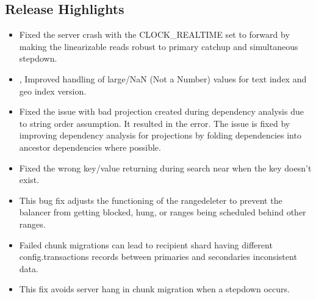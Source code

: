 \documentclass[letterpaper,10pt,english]{sphinxmanual}
\begin{document}
\subsection{Release Highlights}
\label{\detokenize{release_notes/4.4.16-16:release-highlights}}\begin{itemize}
\item {} 
\sphinxAtStartPar
{} \sphinxhyphen{} Fixed the server crash with the CLOCK\_REALTIME set to forward by making the linearizable reads robust to primary catch\sphinxhyphen{}up and simultaneous stepdown.

\item {} 
\sphinxAtStartPar
{},  \sphinxhyphen{} Improved handling of large/NaN (Not a Number) values for text index and geo index version.

\item {} 
\sphinxAtStartPar
{} \sphinxhyphen{}  Fixed the issue with bad projection created during dependency analysis due to string order assumption. It resulted in the  error. The issue is fixed by improving dependency analysis for projections by folding dependencies into ancestor dependencies where possible.

\item {} 
\sphinxAtStartPar
{} \sphinxhyphen{} Fixed the wrong key/value returning during search near when the key doesn’t exist.

\item {} 
\sphinxAtStartPar
{} \sphinxhyphen{} This bug fix adjusts the functioning of the range\sphinxhyphen{}deleter to prevent the balancer from getting blocked, hung, or ranges being scheduled behind other ranges.

\item {} 
\sphinxAtStartPar
{} \sphinxhyphen{} Failed chunk migrations can lead to recipient shard having different config.transactions records between primaries and secondaries \sphinxhyphen{} inconsistent data.

\item {} 
\sphinxAtStartPar
{} \sphinxhyphen{} This fix avoids server hang in chunk migration when a step\sphinxhyphen{}down occurs.

\end{itemize}
\end{document}

